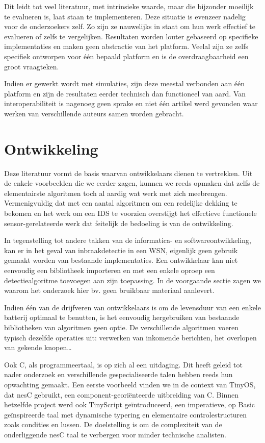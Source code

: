 Dit leidt tot veel literatuur, met intrinsieke waarde, maar die bijzonder
moeilijk te evalueren is, laat staan te implementeren. Deze situatie is
evenzeer nadelig voor de onderzoekers zelf. Zo zijn ze nauwelijks in staat om
hun werk effectief te evalueren of zelfs te vergelijken. Resultaten worden
louter gebaseerd op specifieke implementaties en maken geen abstractie van het
platform. Veelal zijn ze zelfs specifiek ontworpen voor \'e\'en bepaald
platform en is de overdraagbaarheid een groot vraagteken.

Indien er gewerkt wordt met simulaties, zijn deze meestal verbonden aan \'e\'en
platform en zijn de resultaten eerder technisch dan functioneel van aard. Van
interoperabiliteit is nagenoeg geen sprake en niet \'e\'en artikel werd
gevonden waar werken van verschillende auteurs samen worden gebracht.

\section{Ontwikkeling}
\label{section:problem-develop}

Deze literatuur vormt de basis waarvan ontwikkelaars dienen te vertrekken. Uit
de enkele voorbeelden die we eerder zagen, kunnen we reeds opmaken dat zelfs de
elementairste algoritmen toch al aardig wat werk met zich meebrengen.
Vermenigvuldig dat met een aantal algoritmen om een redelijke dekking te
bekomen en het werk om een IDS te voorzien overstijgt het effectieve
functionele sensor-gerelateerde werk dat feitelijk de bedoeling is van de
ontwikkeling.

In tegenstelling tot andere takken van de informatica- en softwareontwikkeling,
kan er in het geval van inbraakdetectie in een WSN, eigenlijk geen gebruik
gemaakt worden van bestaande implementaties. Een ontwikkelaar kan niet
eenvoudig een bibliotheek importeren en met een enkele oproep een
detectiealgoritme toevoegen aan zijn toepassing. In de voorgaande sectie zagen
we waarom het onderzoek hier bv. geen bruikbaar materiaal aanlevert.

Indien \'e\'en van de drijfveren van ontwikkelaars is om de levensduur van een
enkele batterij optimaal te benutten, is het eenvoudig hergebruiken van
bestaande bibliotheken van algoritmen geen optie. De verschillende algoritmen
voeren typisch dezelfde operaties uit: verwerken van inkomende berichten, het
overlopen van gekende knopen\dots

Ook C, als programmeertaal, is op zich al een uitdaging. Dit heeft geleid tot
nader onderzoek en verschillende gespecialiseerde talen hebben reeds hun
opwachting gemaakt. Een eerste voorbeeld vinden we in de context van TinyOS,
dat nesC \citep{gay2003nesc} gebruikt, een component-geori\"enteerde
uitbreiding van C. Binnen hetzelfde project werd ook TinyScript
\citep{levis2004tinyscript} ge\"introduceerd, een imperatieve, op Basic
ge\"inspireerde taal met dynamische typering en elementaire controlestructuren
zoals condities en lussen. De doelstelling is om de complexiteit van de
onderliggende nesC taal te verbergen voor minder technische analisten.

